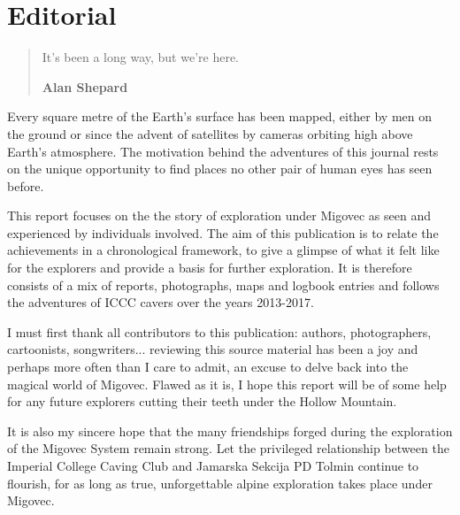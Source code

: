 \chapter*{Editorial}

\begin{quote}
It's been a long way, but we're here.
 
\raggedleft\normalsize\sffamily\textbf{Alan Shepard} \par\end{quote}

Every square metre of the Earth's surface has been mapped, either by men on the ground or since the advent of satellites by cameras orbiting high above Earth's atmosphere. The motivation behind the adventures of this journal rests on the unique opportunity to find places no other pair of human eyes has seen before.

This report focuses on the the story of exploration under Migovec as seen and experienced by individuals involved. The aim of this publication is to relate the achievements in a chronological framework, to give a glimpse of what it felt like for the explorers and provide a basis for further exploration. It is therefore consists of a mix of reports, photographs, maps and logbook entries and follows the adventures of ICCC cavers over the years 2013-2017.

I must first thank all contributors to this publication: authors, photographers, cartoonists, songwriters... reviewing this source material has been a joy and perhaps more often than I care to admit, an excuse to delve back into the magical world of Migovec. Flawed as it is, I hope this report will be of some help for any future explorers cutting their teeth under the Hollow Mountain. 

It is also my sincere hope that the many friendships forged during the exploration of the Migovec System remain strong. Let the privileged relationship between the Imperial College Caving Club and Jamarska Sekcija PD Tolmin continue to flourish, for as long as true, unforgettable alpine exploration takes place under Migovec.



\mydelimiter

